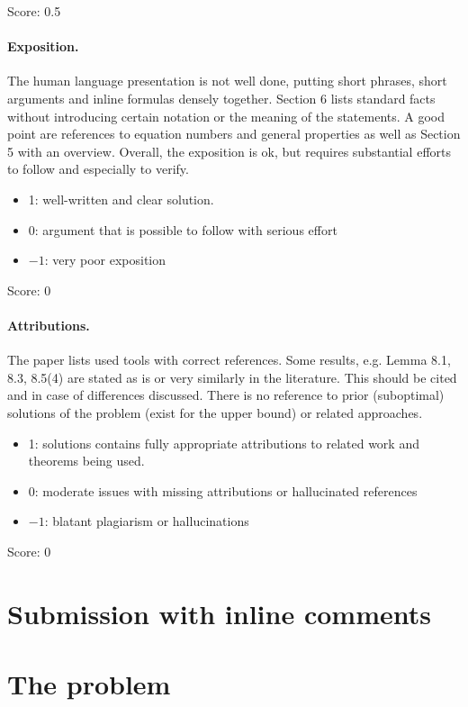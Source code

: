 \documentclass[11pt]{article}
\theoremstyle{definition}
\theoremstyle{remark}
\begin{document}
\noindent Score: 0.5

\paragraph{Exposition.}

The human language presentation is not well done, putting short phrases, short arguments and inline formulas densely together. Section 6 lists standard facts without introducing certain notation or the meaning of the statements. A good point are references to equation numbers and general properties as well as Section 5 with an overview. Overall, the exposition is ok, but requires substantial efforts to follow and especially to verify.
\begin{itemize}
	\item  1: well-written and clear solution.
	\item  0: argument that is possible to follow with serious effort
	\item  $-1$: very poor exposition
\end{itemize}

\noindent Score: 0

\paragraph{Attributions.}

The paper lists used tools with correct references. Some results, e.g. Lemma 8.1, 8.3, 8.5(4) are stated as is or very similarly in the literature. This should be cited and in case of differences discussed. There is no reference to prior (suboptimal) solutions of the problem (exist for the upper bound) or related approaches.
\begin{itemize}
	\item  1: solutions contains fully appropriate attributions
		to related work and theorems being used.
	\item  0: moderate issues with missing attributions or hallucinated references
	\item  $-1$: blatant plagiarism or hallucinations
\end{itemize}

\noindent Score: 0

\newpage
\section{Submission with inline comments}


\section{The problem}
\end{document}
